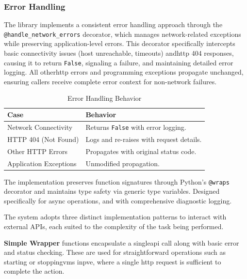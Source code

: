        \subsubsection{Error Handling}
            The library implements a consistent error handling approach through the \texttt{@handle\_network\_errors} 
            decorator, which manages network-related exceptions while preserving application-level errors. This 
            decorator specifically intercepts basic connectivity issues (host unreachable, timeouts) and\ac{http} 404 
            responses, causing it to return \texttt{False}, signaling a failure, and maintaining detailed error logging. All 
            other\ac{http} errors and programming exceptions propagate unchanged, ensuring callers receive 
            complete error context for non-network failures.

            \begin{table}[h]
                \centering
                \caption{Error Handling Behavior}
                \label{tab:error-handling}
                \begin{tabular}{@{}lp{9cm}@{}}  %
                    \toprule
                    \textbf{Case} & \textbf{Behavior} \\
                    \midrule
                    Network Connectivity & Returns \texttt{False} with error logging. \\
                    HTTP 404 (Not Found) & Logs and re-raises with request details. \\
                    Other HTTP Errors & Propagates with original status code. \\
                    Application Exceptions & Unmodified propagation. \\
                    \bottomrule
                \end{tabular}
            \end{table}
        
            The implementation preserves function signatures through Python's \texttt{@wraps} decorator and maintains 
            type safety via generic type variables. Designed specifically for async operations, and with comprehensive 
            diagnostic logging.

            The system adopts three distinct implementation patterns to interact with external APIs, each suited to the 
            complexity of the task being performed.

            \textbf{Simple Wrapper} functions encapsulate a single\ac{api} call along with basic error and status checking. 
            These are used for straightforward operations such as starting or stopping\ac{vm}s in\ac{pve}, where a single
            \ac{http} request is sufficient to complete the action.

